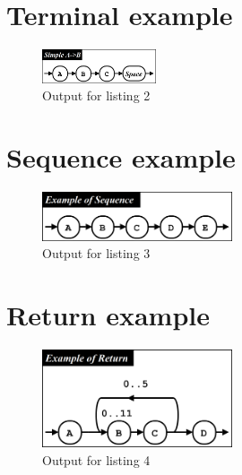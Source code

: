 \documentclass[12pt,a4paper]{article}
\begin{document}
\section{Terminal example}



\begin{figure}[h!]
\caption{Output for listing 2}
\centering
\includegraphics[width=0.3\textwidth]{results/ex01.png}
\end{figure}

\section{Sequence example}



\begin{figure}[h!]
\caption{Output for listing 3}
\centering
\includegraphics[width=0.5\textwidth]{results/ex05.png}
\end{figure}

\pagebreak

\section{Return example}



\begin{figure}[h!]
\caption{Output for listing 4}
\centering
\includegraphics[width=0.5\textwidth]{results/ex07.png}
\end{figure}
\end{document}
